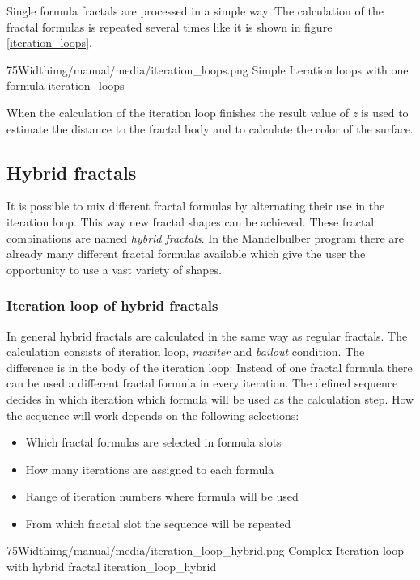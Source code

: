 Single formula fractals are processed in a simple way. The calculation of the fractal
formulas is repeated several times like it is shown in figure \ref{iteration_loops}. \nolinebreak \nopagebreak


\simpleImageWithCaption75Width{img/manual/media/iteration_loops.png}
{Simple Iteration loops with one formula}
{iteration_loops}

When the calculation of the iteration loop finishes the result value of \emph{z} is
used to estimate the distance to the fractal body and to calculate the color of the surface.

\subsection{Hybrid fractals}

It is possible to mix different fractal formulas by alternating their use in the iteration loop.
This way new fractal shapes can be achieved. These fractal combinations are named \emph{hybrid fractals}. 
In the Mandelbulber program there are already many different fractal formulas available which give the user 
the opportunity to use a vast variety of shapes.

\subsubsection{Iteration loop of hybrid fractals}

In general hybrid fractals are calculated in the same way as regular fractals.
The calculation consists of iteration loop, \emph{maxiter} and \emph{bailout} condition. The
difference is in the body of the iteration loop: Instead of one fractal formula there
can be used a different fractal formula in every iteration. The defined
sequence decides in which iteration which formula will be used as the calculation step.
How the sequence will work depends on the following selections:
\begin{itemize}
	\item Which fractal formulas are selected in formula slots
	\item How many iterations are assigned to each formula
	\item Range of iteration numbers where formula will be used
	\item From which fractal slot the sequence will be repeated
\end{itemize}

\simpleImageWithCaption75Width{img/manual/media/iteration_loop_hybrid.png}
{Complex Iteration loop with hybrid fractal}
{iteration_loop_hybrid}

